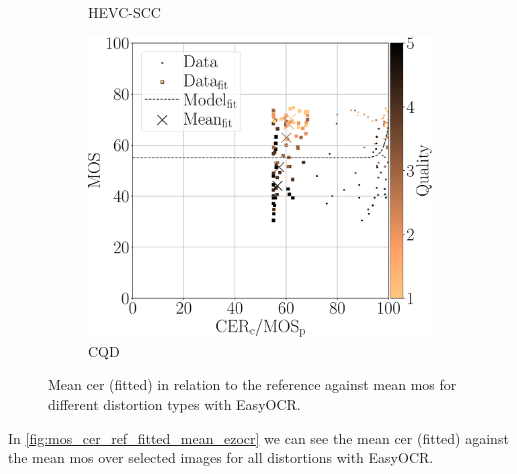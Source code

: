 \begin{figure}[h]
\begin{subfigure}[b]{0.3\textwidth}
        \caption{HEVC-SCC}
        \label{fig:mos_cer_ref_fitted_mean_ezocr_HEVC-SCC}
    \end{subfigure}
    \hfill
    \begin{subfigure}[b]{0.3\textwidth}
        \includegraphics[width=\textwidth]{../../images/analyze/mos_cer_ref_fitted_mean_ezocr_CQD.pdf}
        \caption{CQD}
        \label{fig:mos_cer_ref_fitted_mean_ezocr_CQD}
    \end{subfigure}
    \caption{Mean \gls{cer} (fitted) in relation to the reference against mean \gls{mos} for different distortion types with EasyOCR.}
\label{fig:mos_cer_ref_fitted_mean_ezocr}
\end{figure}

In \autoref{fig:mos_cer_ref_fitted_mean_ezocr} we can see the mean \gls{cer} (fitted) against the mean \gls{mos} over selected images for all distortions with EasyOCR.

